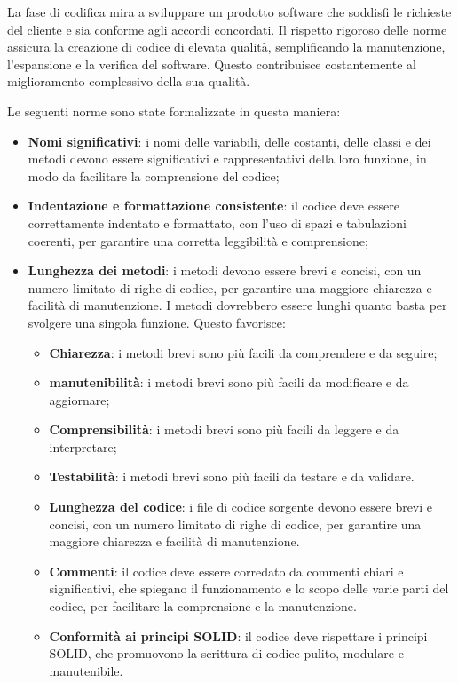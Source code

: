 La fase di codifica mira a sviluppare un prodotto software che soddisfi le richieste del cliente e sia conforme agli accordi concordati. Il rispetto rigoroso delle norme assicura la creazione di codice di elevata qualità, semplificando la manutenzione, l'espansione e la verifica del software. Questo contribuisce costantemente al miglioramento complessivo della sua qualità.

Le seguenti norme sono state formalizzate in questa maniera:
\begin{itemize}
	\item \textbf{Nomi significativi}: i nomi delle variabili, delle costanti, delle classi e dei metodi devono essere significativi e rappresentativi della loro funzione, in modo da facilitare la comprensione del codice;
	\item \textbf{Indentazione e formattazione consistente}: il codice deve essere correttamente indentato e formattato, con l'uso di spazi e tabulazioni coerenti, per garantire una corretta leggibilità e comprensione;
	\item \textbf{Lunghezza dei metodi}: i metodi devono essere brevi e concisi, con un numero limitato di righe di codice, per garantire una maggiore chiarezza e facilità di manutenzione. I metodi dovrebbero essere lunghi quanto basta per svolgere una singola funzione. Questo favorisce:
	\begin{itemize}
		\item \textbf{Chiarezza}: i metodi brevi sono più facili da comprendere e da seguire;
		\item \textbf{manutenibilità}: i metodi brevi sono più facili da modificare e da aggiornare;
		\item \textbf{Comprensibilità}: i metodi brevi sono più facili da leggere e da interpretare;
		\item \textbf{Testabilità}: i metodi brevi sono più facili da testare e da validare.
		\item \textbf{Lunghezza del codice}: i file di codice sorgente devono essere brevi e concisi, con un numero limitato di righe di codice, per garantire una maggiore chiarezza e facilità di manutenzione.
		\item \textbf{Commenti}: il codice deve essere corredato da commenti chiari e significativi, che spiegano il funzionamento e lo scopo delle varie parti del codice, per facilitare la comprensione e la manutenzione.
		\item \textbf{Conformità ai principi SOLID}: il codice deve rispettare i principi SOLID, che promuovono la scrittura di codice pulito, modulare e manutenibile.
	\end{itemize}
\end{itemize}

